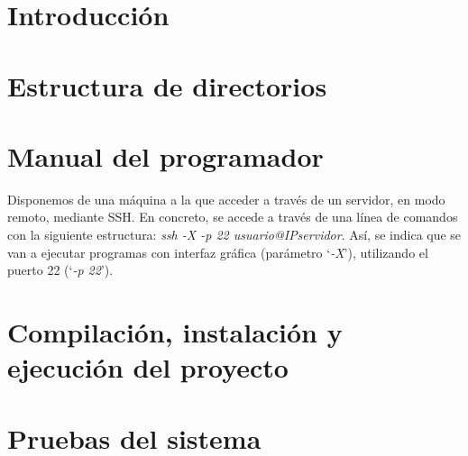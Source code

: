 
\section{Introducción}

\section{Estructura de directorios}

\section{Manual del programador}

Disponemos de una máquina a la que acceder a través de un servidor, en modo remoto, mediante SSH. En concreto, se accede a través de una línea de comandos con la siguiente estructura: \textit{ssh -X -p 22 usuario@IPservidor}. Así, se indica que se van a ejecutar programas con interfaz gráfica  (parámetro `\textit{-X}'), utilizando el puerto 22 (`\textit{-p 22}').

\section{Compilación, instalación y ejecución del proyecto}

\section{Pruebas del sistema}

